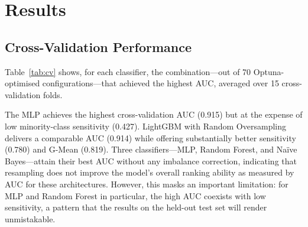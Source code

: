\documentclass[a4paper,twoside]{article}
\begin{document}
\section{Results}
\label{sec:results}

\subsection{Cross-Validation Performance}

Table~\ref{tab:cv} shows, for each classifier, the combination---out of 70
Optuna-optimised configurations---that achieved the highest AUC, averaged over
15 cross-validation folds.

\begin{table}[ht!]
  \centering
  \caption{Best cross-validation results per classifier (Optuna, 70 combinations,
    15-fold repeated CV). Sensitivity and specificity are for the short-survival
    (positive) class. G-Mean $= \sqrt{\text{Sensitivity} \times \text{Specificity}}$.}
  \label{tab:cv}
\end{table}

The MLP achieves the highest cross-validation AUC (0.915) but at the expense of
low minority-class sensitivity (0.427). LightGBM with Random Oversampling
delivers a comparable AUC (0.914) while offering substantially better sensitivity
(0.780) and G-Mean (0.819). Three classifiers---MLP, Random Forest, and Naïve
Bayes---attain their best AUC without any imbalance correction, indicating that
resampling does not improve the model's overall ranking ability as measured by
AUC for these architectures. However, this masks an important limitation: for
MLP and Random Forest in particular, the high AUC coexists with low sensitivity,
a pattern that the results on the held-out test set will render unmistakable.
\end{document}

